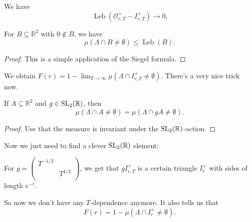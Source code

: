 \documentclass[reqno]{amsart} 
\numberwithin{theorem}{section}
\numberwithin{equation}{section}
\begin{document}
\begin{lemma}\label{lemma:cnrbhysi29}
  We have
  \begin{equation*}
    \operatorname{Leb}(\mathcal{O}_{r, T}^+ - I_{r, T}^+) \rightarrow 0.
  \end{equation*}
\end{lemma}

\begin{lemma}\label{lemma:cnrbhysj11}
  For $B \subseteq \mathbb{R}^2$ with $0 \notin B$, we have
  \begin{equation*}
    \mu \left( \Lambda \cap B \neq \emptyset \right) \leq \operatorname{Leb}(B).
  \end{equation*}
\end{lemma}
\begin{proof}
  This is a simple application of the Siegel formula.
\end{proof}

We obtain $F(r) = 1 - \lim_{T \rightarrow \infty} \mu \left( \Lambda \cap I_{r, T}^+ \neq \emptyset \right)$.  There's a very nice trick now.

\begin{lemma}\label{lemma:cnrbhywc90}
  If $A \subseteq \mathbb{R}^2$ and $g \in \operatorname{SL}_2(\mathbb{R})$, then
  \begin{equation*}
    \mu \left( \Lambda \cap A \neq \emptyset \right) =
    \mu \left( \Lambda \cap g A \neq \emptyset \right).
  \end{equation*}
\end{lemma}
\begin{proof}
  Use that the measure is invariant under the $\operatorname{SL}_2(\mathbb{R})$-action.
\end{proof}
Now we just need to find a clever $\operatorname{SL}_2(\mathbb{R})$ element:
\begin{lemma}\label{lemma:cnrbhy1cvg}
  For $g =
  \begin{pmatrix}
    T^{-1/2}    &  \\
                & T^{1/2} \\
  \end{pmatrix}$, we get that $g  I_{r, T}^+$ is a certain triangle $I_r^+$ with sides of length $e^{- r}$.
\end{lemma}
So now we don't have any $T$-dependence anymore.  It also tells us that
\begin{equation}\label{eq:cnrbhy0p4f}
  F(r) = 1 - \mu \left( \Lambda \cap I_r^+ \neq \emptyset \right).
\end{equation}
\end{document}
